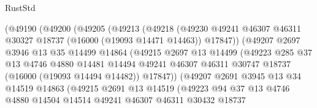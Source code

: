 \begin{lexlean}{RustStd}
\begin{coremodule}
                      (@49190
                        (@49200
                          (@49205
                            (@49213
                              (@49218
                                (@49230
                                  @49241
                                  @46307
                                  @46311
                                  @30327
                                  @18737
                                  (@16000 (@19093 @14471 @14463))
                                  @17847))
                              (@49207
                                @2697
                                @3946
                                @13
                                @35
                                @14499
                                @14864
                                (@49215
                                  @2697
                                  @13
                                  @14499
                                  (@49223
                                    @285
                                    @37
                                    @13
                                    @4746
                                    @4880
                                    @14481
                                    @14494
                                    @49241
                                    @46307
                                    @46311
                                    @30747
                                    @18737
                                    (@16000 (@19093 @14494 @14482))
                                    @17847))
                                (@49207
                                  @2691
                                  @3945
                                  @13
                                  @34
                                  @14519
                                  @14863
                                  (@49215
                                    @2691
                                    @13
                                    @14519
                                    (@49223
                                      @94
                                      @37
                                      @13
                                      @4746
                                      @4880
                                      @14504
                                      @14514
                                      @49241
                                      @46307
                                      @46311
                                      @30432
                                      @18737

\end{coremodule}
\end{lexlean}
